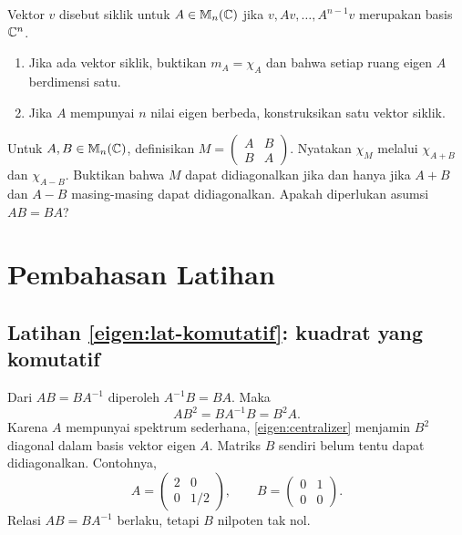 \begin{latihan}\label{eigen:lat-siklik}
    Vektor $v$ disebut siklik untuk $A\in\mathbb{M}_n(\mathbb{C})$ jika
    $v,Av,\ldots,A^{n-1}v$ merupakan basis $\mathbb{C}^n$.
    \begin{enumerate}[label=(\alph*),nosep]
        \item Jika ada vektor siklik, buktikan $m_A=\chi_A$ dan bahwa
            setiap ruang eigen $A$ berdimensi satu.
        \item Jika $A$ mempunyai $n$ nilai eigen berbeda, konstruksikan
            satu vektor siklik.
    \end{enumerate}
\end{latihan}

\begin{latihan}\label{eigen:lat-blok}
    Untuk $A,B\in\mathbb{M}_n(\mathbb{C})$, definisikan
    $M=\begin{pmatrix}A&B\\B&A\end{pmatrix}$.
    Nyatakan $\chi_M$ melalui $\chi_{A+B}$ dan $\chi_{A-B}$.
    Buktikan bahwa $M$ dapat didiagonalkan jika dan hanya jika
    $A+B$ dan $A-B$ masing-masing dapat didiagonalkan.
    Apakah diperlukan asumsi $AB=BA$?
\end{latihan}

\ifpembahasan
\section{Pembahasan Latihan}
\label{dekomp:pembahasan}

\subsection*{Latihan \ref{eigen:lat-komutatif}: kuadrat yang komutatif}
Dari $AB=BA^{-1}$ diperoleh $A^{-1}B=BA$.
Maka
\[
    AB^2=BA^{-1}B=B^2A.
\]
Karena $A$ mempunyai spektrum sederhana, \autoref{eigen:centralizer}
menjamin $B^2$ diagonal dalam basis vektor eigen $A$.
Matriks $B$ sendiri belum tentu dapat didiagonalkan. Contohnya,
\[
    A=\begin{pmatrix}2&0\\0&1/2\end{pmatrix},\qquad
    B=\begin{pmatrix}0&1\\0&0\end{pmatrix}.
\]
Relasi $AB=BA^{-1}$ berlaku, tetapi $B$ nilpoten tak nol.

